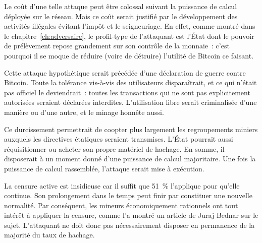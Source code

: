 Le coût d'une telle attaque peut être colossal suivant la puissance de calcul déployée sur le réseau. Mais ce coût serait justifié par le développement des activités illégales évitant l'impôt et le seigneuriage. En effet, comme montré dans le chapitre~\ref{ch:adversaire}, le profil-type de l'attaquant est l'État dont le pouvoir de prélèvement repose grandement sur son contrôle de la monnaie~: c'est pourquoi il se moque de réduire (voire de détruire) l'utilité de Bitcoin ce faisant.

Cette attaque hypothétique serait précédée d'une déclaration de guerre contre Bitcoin. Toute la tolérance vis-à-vis des utilisateurs disparaîtrait, et ce qui n'était pas officiel le deviendrait~: toutes les transactions qui ne sont pas explicitement autorisées seraient déclarées interdites. L'utilisation libre serait criminalisée d'une manière ou d'une autre, et le minage honnête aussi.


Ce durcissement permettrait de coopter plus largement les regroupements miniers auxquels les directives étatiques seraient transmises. L'État pourrait aussi réquisitionner ou acheter son propre matériel de hachage. En somme, il disposerait à un moment donné d'une puissance de calcul majoritaire. Une fois la puissance de calcul rassemblée, l'attaque serait mise à exécution.

La censure active est insidieuse car il suffit que 51~\% l'applique pour qu'elle continue. Son prolongement dans le temps peut finir par constituer une nouvelle normalité. Par conséquent, les mineurs économiquement rationnels ont tout intérêt à appliquer la censure, comme l'a montré un article de Juraj Bednar sur le sujet. L'attaquant ne doit donc pas nécessairement disposer en permanence de la majorité du taux de hachage.

